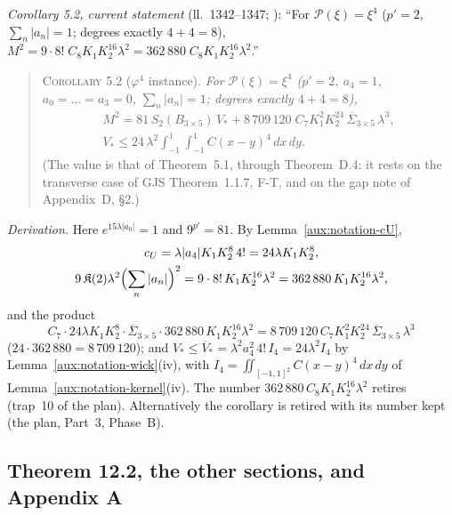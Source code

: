 \emph{Corollary 5.2, current statement} (ll.~1342--1347; \cite[p.~19]{R}): ``For
$\mathscr P(\xi)=\xi^4$ ($p'=2$, $\sum_n|a_n|=1$; degrees exactly $4+4=8$),
$M^2=9\cdot8!\;C_8K_1K_2^{16}\lambda^2=362\,880\;C_8K_1K_2^{16}\lambda^2$.''
\begin{quote}\small
\textsc{Corollary 5.2} ($\varphi^4$ instance).  \emph{For $\mathscr P(\xi)=\xi^4$ ($p'=2$, $a_4=1$,
$a_0=\dots=a_3=0$, $\sum_n|a_n|=1$; degrees exactly $4+4=8$),}
\begin{gather*}
 M^2=81\,S_2(B_{3\times5})\,V_*+8\,709\,120\;C_7K_1^2K_2^{24}\,\overline\Sigma_{3\times5}\,\lambda^3,\\
 V_*\le24\,\lambda^2\int_{-1}^1\!\int_{-1}^1C(x-y)^4\,dx\,dy .
\end{gather*}
(The value is that of Theorem~5.1, through Theorem~D.4: it rests on the transverse case of GJS
Theorem~1.1.7, F-T, and on the gap note of Appendix~D, \S2.)
\end{quote}
\emph{Derivation.}  Here $e^{15\lambda|a_0|}=1$ and $9^{p'}=81$.  By
Lemma~\ref{aux:notation-cU},
\begin{gather*}
 c_U=\lambda|a_4|K_1K_2^{8}\,4!=24\lambda K_1K_2^8 ,\\
 9\,\mathfrak K(2)\lambda^2\Bigl(\sum_n|a_n|\Bigr)^2=9\cdot8!\,K_1K_2^{16}\lambda^2
 =362\,880\,K_1K_2^{16}\lambda^2 ,
\end{gather*}
and the product
\[
 C_7\cdot24\lambda K_1K_2^8\cdot\overline\Sigma_{3\times5}\cdot362\,880\,K_1K_2^{16}\lambda^2
 =8\,709\,120\,C_7K_1^2K_2^{24}\,\overline\Sigma_{3\times5}\,\lambda^3
\]
($24\cdot362\,880=8\,709\,120$); and $V_*\le\overline V_*=\lambda^2a_4^2\,4!\,I_4=24\lambda^2I_4$ by Lemma~\ref{aux:notation-wick}(iv),
with $I_4=\iint_{[-1,1]^2}C(x-y)^4\,dx\,dy$ of Lemma~\ref{aux:notation-kernel}(iv).  The number
$362\,880\,C_8K_1K_2^{16}\lambda^2$ retires (trap~10 of the plan).  Alternatively the corollary is
retired with its number kept (the plan, Part~3, Phase~B).

\subsection{Theorem 12.2, the other sections, and Appendix A}\label{sub:cons-rest}

